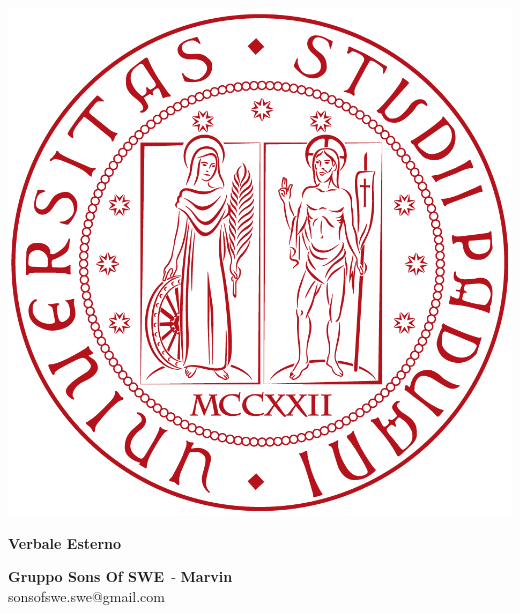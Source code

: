 \documentclass[a4paper, oneside, openany]{article}
\makeatletter
\newcommand{\Titolo}{Verbale Esterno}
\newcommand{\Gruppo}{Gruppo Sons Of SWE}
\newcommand{\Data}{7 Marzo 2018}
\newcommand{\NomeProgetto}{Marvin}
\newcommand{\Mail}{sonsofswe.swe@gmail.com}
\makeatother
\begin{document}
\begin{titlepage}
  \begin{center}

  \begin{center}
   \centerline{\includegraphics[scale=0.24]{../template/img/logo.png}}
  \end{center}
  
  \vspace{1cm}

  \begin{Huge}
    \textbf{\Titolo{}} \\
  \end{Huge}

  \vspace{9pt}  
  
  \begin{large}
  	\textbf{\Gruppo{}}\ - \textbf{\NomeProgetto{}}\\%
  	\vspace{6pt}
  	\Mail{}
  \end{large}	  
  

\end{center}
\end{titlepage}
\end{document}
